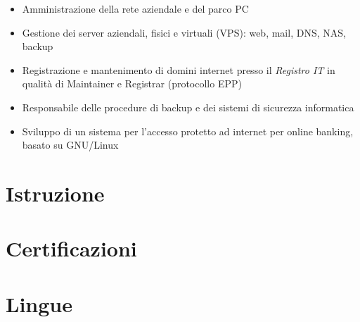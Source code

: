 \documentclass[a4paper, 11pt]{moderncv}
\begin{document}
\vspace{3mm}
        {\begin{itemize}
          \item Amministrazione della rete aziendale e del parco PC
          \item Gestione dei server aziendali, fisici e virtuali (VPS): web, mail, DNS, NAS, backup
          \item Registrazione e mantenimento di domini internet presso il \emph{Registro IT} in qualità di Maintainer e Registrar (protocollo EPP)
          \item Responsabile delle procedure di backup e dei sistemi di sicurezza informatica
          \item Sviluppo di un sistema per l'accesso protetto ad internet per online banking, basato su GNU/Linux
        \end{itemize}}
\section{Istruzione}
\section{Certificazioni}
\section{Lingue}
\vspace{3mm}
\closesection
\pagebreak
\end{document}

